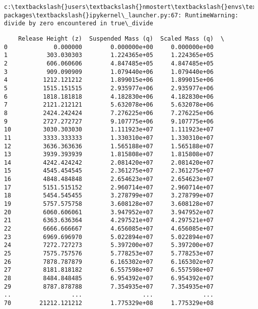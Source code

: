 \documentclass[11pt]{article}
\begin{document}
    \begin{Verbatim}[commandchars=\\\{\}]
c:\textbackslash{}users\textbackslash{}nmostert\textbackslash{}envs\textbackslash{}spew\textbackslash{}lib\textbackslash{}site-packages\textbackslash{}ipykernel\_launcher.py:67: RuntimeWarning: divide by zero encountered in true\_divide

    \end{Verbatim}

    
    \begin{verbatim}
    Release Height (z)  Suspended Mass (q)  Scaled Mass (q)  \
0             0.000000        0.000000e+00     0.000000e+00   
1           303.030303        1.224365e+05     1.224365e+05   
2           606.060606        4.847485e+05     4.847485e+05   
3           909.090909        1.079440e+06     1.079440e+06   
4          1212.121212        1.899015e+06     1.899015e+06   
5          1515.151515        2.935977e+06     2.935977e+06   
6          1818.181818        4.182830e+06     4.182830e+06   
7          2121.212121        5.632078e+06     5.632078e+06   
8          2424.242424        7.276225e+06     7.276225e+06   
9          2727.272727        9.107775e+06     9.107775e+06   
10         3030.303030        1.111923e+07     1.111923e+07   
11         3333.333333        1.330310e+07     1.330310e+07   
12         3636.363636        1.565188e+07     1.565188e+07   
13         3939.393939        1.815808e+07     1.815808e+07   
14         4242.424242        2.081420e+07     2.081420e+07   
15         4545.454545        2.361275e+07     2.361275e+07   
16         4848.484848        2.654623e+07     2.654623e+07   
17         5151.515152        2.960714e+07     2.960714e+07   
18         5454.545455        3.278799e+07     3.278799e+07   
19         5757.575758        3.608128e+07     3.608128e+07   
20         6060.606061        3.947952e+07     3.947952e+07   
21         6363.636364        4.297521e+07     4.297521e+07   
22         6666.666667        4.656085e+07     4.656085e+07   
23         6969.696970        5.022894e+07     5.022894e+07   
24         7272.727273        5.397200e+07     5.397200e+07   
25         7575.757576        5.778253e+07     5.778253e+07   
26         7878.787879        6.165302e+07     6.165302e+07   
27         8181.818182        6.557598e+07     6.557598e+07   
28         8484.848485        6.954392e+07     6.954392e+07   
29         8787.878788        7.354935e+07     7.354935e+07   
..                 ...                 ...              ...   
70        21212.121212        1.775329e+08     1.775329e+08   

\end{verbatim}
\end{document}
